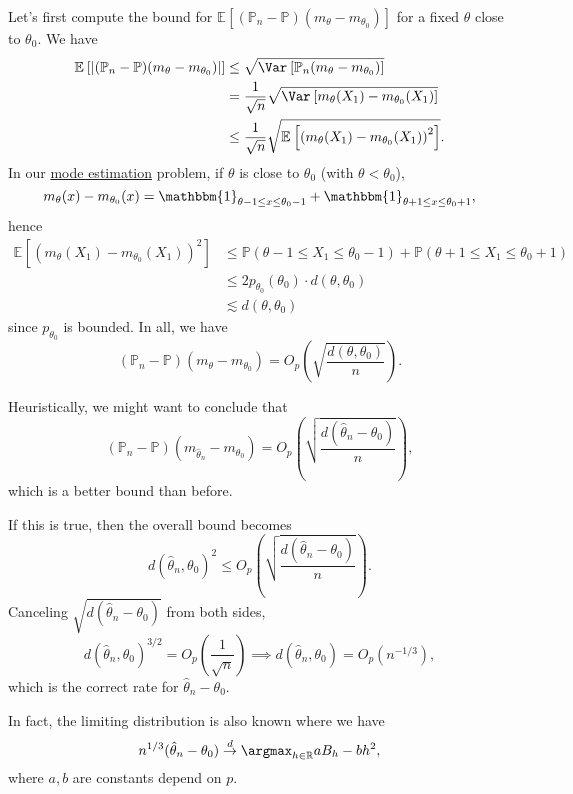 Let's first compute the bound for \(\mathbb{E}_{}\left[(\mathbb{P} _n - \mathbb{P} ) (m_\theta - m_{\theta _0})\right] \) for a fixed \(\theta \) close to \(\theta _0\). We have
\[
	\begin{split}
		\mathbb{E}_{}\left[\vert (\mathbb{P} _n - \mathbb{P} ) (m_\theta - m_{\theta _0}) \vert \right]
		&\leq \sqrt{\Var_{}\left[\mathbb{P} _n(m_\theta - m_{\theta _0}) \right] } \\
		&= \frac{1}{\sqrt{n} } \sqrt{\Var_{}\left[m_\theta (X_1) - m_{\theta _0}(X_1) \right] } \\
		&\leq \frac{1}{\sqrt{n} } \sqrt{\mathbb{E}_{}\left[\left( m_\theta (X_1) - m_{\theta _0}(X_1) \right) ^2 \right] } .
	\end{split}
\]
In our \hyperref[eg:mode-estimation]{mode estimation} problem, if \(\theta \) is close to \(\theta _0\) (with \(\theta < \theta _0\)),
\[
	m_\theta (x) - m_{\theta _0}(x)
	= \mathbbm{1}_{\theta -1 \leq x \leq \theta _0 - 1} + \mathbbm{1}_{\theta +1 \leq x \leq \theta _0 + 1},
\]
hence
\[
	\begin{split}
		\mathbb{E}_{}\left[\left( m_\theta (X_1) - m_{\theta _0}(X_1) \right) ^2 \right]
		&\leq \mathbb{P} (\theta -1 \leq X_1 \leq \theta _0 - 1) + \mathbb{P} (\theta +1 \leq X_1 \leq \theta _0 + 1) \\
		&\leq 2 p_{\theta _0}(\theta _0) \cdot d(\theta , \theta _0) \\
		&\lesssim d(\theta , \theta _0)
	\end{split}
\]
since \(p_{\theta _0}\) is bounded. In all, we have
\[
	(\mathbb{P} _n - \mathbb{P} )(m_\theta - m_{\theta _0})
	= O_p \left( \sqrt{\frac{d(\theta , \theta _0)}{n}} \right) .
\]

\begin{intuition}[Heuristic]
	Heuristically, we might want to conclude that
	\[
		(\mathbb{P} _n - \mathbb{P} ) (m_{\hat{\theta } _n } - m_{\theta _0})
		= O_p \left( \sqrt{\frac{d(\hat{\theta } _n - \theta _0)}{n}} \right),
	\]
	which is a better bound than before.
\end{intuition}

If this is true, then the overall bound becomes
\[
	d(\hat{\theta } _n , \theta _0)^2
	\leq O_p \left( \sqrt{\frac{d(\hat{\theta } _n - \theta _0)}{n}} \right) .
\]
Canceling \(\sqrt{d(\hat{\theta } _n - \theta _0)} \) from both sides,
\[
	d(\hat{\theta } _n , \theta _0)^{3 / 2} = O_p \left( \frac{1}{\sqrt{n} } \right)
	\implies d(\hat{\theta } _n , \theta _0) = O_p(n^{-1 / 3}),
\]
which is the correct rate for \(\hat{\theta } _n - \theta _0\).

\begin{remark}
	In fact, the limiting distribution is also known where we have
	\[
		n^{1 / 3} (\hat{\theta } _n - \theta _0) \overset{d}{\to } \argmax_{h\in \mathbb{R} } aB_h - b h^2,
	\]
	where \(a, b\) are constants depend on \(p\).
\end{remark}